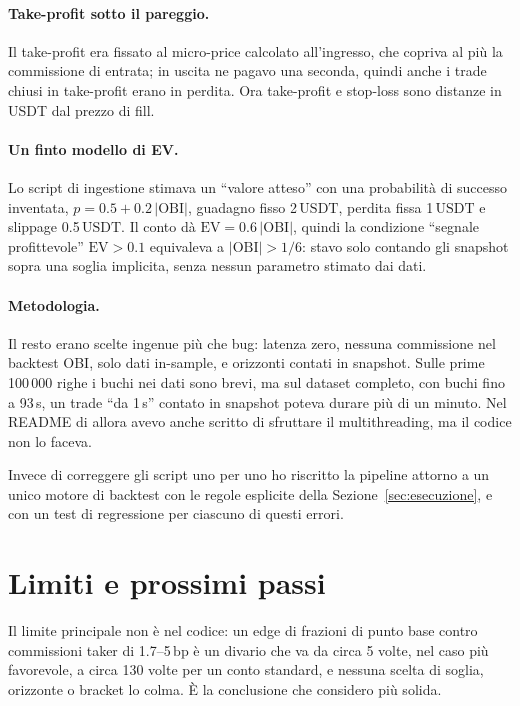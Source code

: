 \documentclass[a4paper,11pt]{article}
\newcommand{\OBI}{\mathrm{OBI}}
\newcommand{\EV}{\mathrm{EV}}
\newcommand{\bp}{\ensuremath{\,\mathrm{bp}}}
\newcommand{\usdt}{\ensuremath{\,\mathrm{USDT}}}
\begin{document}
\paragraph{Take-profit sotto il pareggio.} Il take-profit era fissato al micro-price calcolato
all'ingresso, che copriva al più la commissione di entrata; in uscita ne pagavo una seconda,
quindi anche i trade chiusi in take-profit erano in perdita. Ora take-profit e stop-loss sono
distanze in USDT dal prezzo di fill.

\paragraph{Un finto modello di EV.} Lo script di ingestione stimava un ``valore atteso'' con
una probabilità di successo inventata, $p = 0.5 + 0.2\,|\OBI|$, guadagno fisso 2\usdt{},
perdita fissa 1\usdt{} e slippage 0.5\usdt{}. Il conto dà $\EV = 0.6\,|\OBI|$, quindi la
condizione ``segnale profittevole'' $\EV > 0.1$ equivaleva a $|\OBI| > 1/6$: stavo solo contando
gli snapshot sopra una soglia implicita, senza nessun parametro stimato dai dati.

\paragraph{Metodologia.} Il resto erano scelte ingenue più che bug: latenza zero, nessuna
commissione nel backtest OBI, solo dati in-sample, e orizzonti contati in snapshot. Sulle prime
100\,000 righe i buchi nei dati sono brevi, ma sul dataset completo, con buchi fino a 93\,s, un
trade ``da 1\,s'' contato in snapshot poteva durare più di un minuto. Nel README di allora
avevo anche scritto di sfruttare il multithreading, ma il codice non lo faceva.

Invece di correggere gli script uno per uno ho riscritto la pipeline attorno a un unico motore
di backtest con le regole esplicite della Sezione~\ref{sec:esecuzione}, e con un test di
regressione per ciascuno di questi errori.

\section{Limiti e prossimi passi}
\label{sec:limiti}

Il limite principale non è nel codice: un edge di frazioni di punto base contro commissioni
taker di 1.7--5\bp{} è un divario che va da circa 5 volte, nel caso più favorevole, a circa
130 volte per un conto standard, e nessuna scelta di soglia, orizzonte o bracket lo colma. È la
conclusione che considero più solida.
\end{document}
